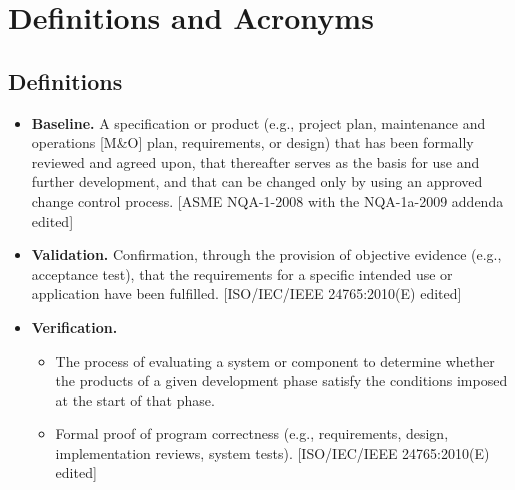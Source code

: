 \section{Definitions and Acronyms}

\subsection{Definitions}
\begin{itemize}
  \item \textbf{Baseline.} A specification or product (e.g., project plan, maintenance and operations [M\&O] plan, requirements, or
design) that has been formally reviewed and agreed upon, that thereafter serves as the basis for use and further
development, and that can be changed only by using an approved change control process. [ASME NQA-1-2008 with the
NQA-1a-2009 addenda edited]
  \item \textbf{Validation.} Confirmation, through the provision of objective evidence (e.g., acceptance test), that the requirements
for a specific intended use or application have been fulfilled. [ISO/IEC/IEEE 24765:2010(E) edited]
  \item \textbf{Verification.}
  \begin{itemize}
     \item The process of evaluating a system or component to determine whether the products of a given development
     phase satisfy the conditions imposed at the start of that phase.
     \item  Formal proof of program correctness (e.g., requirements, design, implementation reviews, system tests).
     [ISO/IEC/IEEE 24765:2010(E) edited]
  \end{itemize}
\end{itemize}

